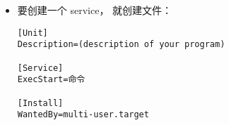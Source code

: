 
\begin{itemize}
\item 要创建一个 service， 就创建文件：
\begin{lstlisting}[language=none,caption=/etc/systemd/system/名字.service]
[Unit]
Description=(description of your program)

[Service]
ExecStart=命令

[Install]
WantedBy=multi-user.target
\end{lstlisting}
\end{itemize}
